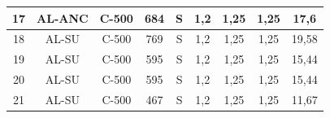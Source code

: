 \begin{table}[htbp]
\begin{tabular}{|c|c|c|c|c|cccc|}
17                                                    & AL-ANC                                                     & C-500                                                           & 684                                                                                                              & S                                                         & \multicolumn{1}{c|}{1,2}                                & \multicolumn{1}{c|}{1,25}                               & \multicolumn{1}{c|}{1,25}                               & 17,6                                                            \\ \hline
18                                                    & AL-SU                                                      & C-500                                                           & 769                                                                                                              & S                                                         & \multicolumn{1}{c|}{1,2}                                & \multicolumn{1}{c|}{1,25}                               & \multicolumn{1}{c|}{1,25}                               & 19,58                                                           \\ \hline
19                                                    & AL-SU                                                      & C-500                                                           & 595                                                                                                              & S                                                         & \multicolumn{1}{c|}{1,2}                                & \multicolumn{1}{c|}{1,25}                               & \multicolumn{1}{c|}{1,25}                               & 15,44                                                           \\ \hline
20                                                    & AL-SU                                                      & C-500                                                           & 595                                                                                                              & S                                                         & \multicolumn{1}{c|}{1,2}                                & \multicolumn{1}{c|}{1,25}                               & \multicolumn{1}{c|}{1,25}                               & 15,44                                                           \\ \hline
21                                                    & AL-SU                                                      & C-500                                                           & 467                                                                                                              & S                                                         & \multicolumn{1}{c|}{1,2}                                & \multicolumn{1}{c|}{1,25}                               & \multicolumn{1}{c|}{1,25}                               & 11,67                                                           \\ \hline

\end{tabular}
\end{table}
